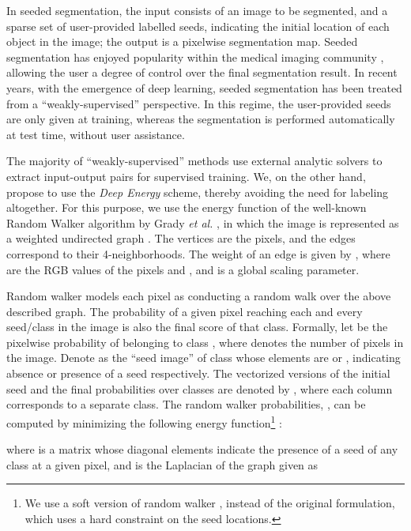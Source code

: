 \documentclass[journal]{IEEEtran}
\begin{document}
In seeded segmentation, the input consists of an image to be segmented, and a sparse set of user-provided labelled seeds, indicating the initial location of each object in the image; the output is a pixelwise segmentation map. Seeded segmentation has enjoyed popularity within the medical imaging community \cite{medical_seeded_seg}, allowing the user a degree of control over the final segmentation result. In recent years, with the emergence of deep learning, seeded segmentation has been treated from a ``weakly-supervised'' perspective. In this regime, the user-provided seeds are only given at training, whereas the segmentation is performed automatically at test time, without user assistance. 

The majority of ``weakly-supervised'' methods \cite{weakly_darrell,weaklysup,scribblesup,whats_the_point} use external analytic solvers to extract input-output pairs for supervised training. We, on the other hand, propose to use the \emph{Deep Energy} scheme, thereby avoiding the need for labeling altogether. For this purpose, we use the energy function of the well-known Random Walker algorithm by Grady \textit{et al.} \cite{random_walker}, in which the image is represented as a weighted undirected graph . The vertices  are the pixels, and the edges  correspond to their 4-neighborhoods. The weight of an edge  is given by , where  are the RGB values of the pixels  and , and  is a global scaling parameter.



Random walker models each pixel as conducting a random walk over the above described graph. The probability of a given pixel reaching each and every seed/class in the image is also the final score of that class. Formally, let  be the pixelwise probability of belonging to class , where  denotes the number of pixels in the image. 
Denote  as the ``seed image'' of class  whose elements are  or , indicating absence or presence of a seed respectively. The vectorized versions of the initial seed and the final probabilities over  classes are denoted by , where each column corresponds to a separate class. The random walker probabilities, , can be computed by minimizing the following energy function\footnote{We use a soft version of random walker \cite{random_walker}, instead of the original formulation, which uses a hard constraint on the seed locations.} \cite{random_walker}:

where  is a matrix whose diagonal elements indicate the presence of a seed of any class at a given pixel, and  is the Laplacian of the graph given as
 
\end{document}

